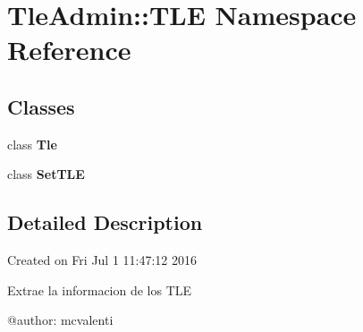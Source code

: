 \section{\-Tle\-Admin\-:\-:\-T\-L\-E \-Namespace \-Reference}
\label{namespace_tle_admin_1_1_t_l_e}
\subsection*{\-Classes}
\begin{DoxyCompactItemize}
\item 
class {\bf \-Tle}
\item 
class {\bf \-Set\-T\-L\-E}
\end{DoxyCompactItemize}


\subsection{\-Detailed \-Description}
\begin{DoxyVerb}
Created on Fri Jul  1 11:47:12 2016

Extrae la informacion de los TLE

@author: mcvalenti
\end{DoxyVerb}
 